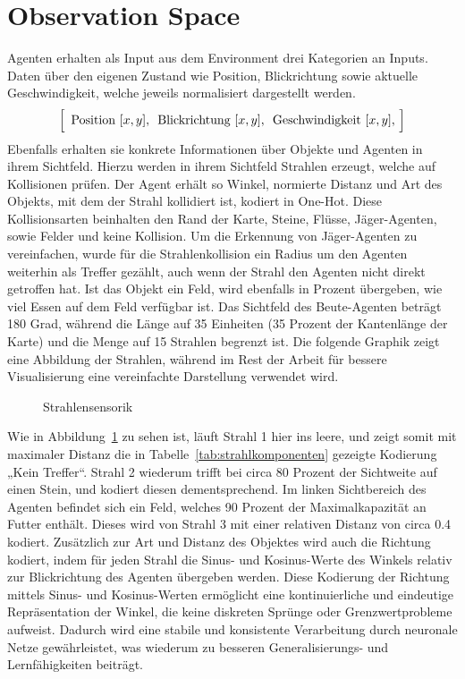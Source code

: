 \section{Observation Space}
Agenten erhalten als Input aus dem Environment drei Kategorien an Inputs. Daten über den eigenen Zustand wie Position, Blickrichtung sowie aktuelle Geschwindigkeit, welche jeweils normalisiert dargestellt werden.
\[
\Bigl[ \,
  \text{ Position }[x,y],\,
  \text{ Blickrichtung }[x,y],\,
  \text{ Geschwindigkeit }[x,y],\,
\Bigr]
\]
Ebenfalls erhalten sie konkrete Informationen über Objekte und Agenten in ihrem Sichtfeld. Hierzu werden in ihrem Sichtfeld Strahlen erzeugt, welche auf Kollisionen prüfen. Der Agent erhält so Winkel, normierte Distanz und Art des Objekts, mit dem der Strahl kollidiert ist, kodiert in One-Hot. Diese Kollisionsarten beinhalten den Rand der Karte, Steine, Flüsse, Jäger-Agenten, sowie Felder und  keine Kollision. Um die Erkennung von Jäger-Agenten zu vereinfachen, wurde für die Strahlenkollision ein Radius um den Agenten weiterhin als Treffer gezählt, auch wenn der Strahl den Agenten nicht direkt getroffen hat. Ist das Objekt ein Feld, wird ebenfalls in Prozent übergeben, wie viel Essen auf dem Feld verfügbar ist. Das Sichtfeld des Beute-Agenten beträgt 180 Grad, während die Länge auf 35 Einheiten (35 Prozent der Kantenlänge der Karte) und die Menge auf 15 Strahlen begrenzt ist. Die folgende Graphik zeigt eine Abbildung der Strahlen, während im Rest der Arbeit für bessere Visualisierung eine vereinfachte Darstellung verwendet wird. 
\begin{figure}[h]
  \centering
  \caption{Strahlensensorik}
  \label{fig:ray-observation}
\end{figure}
\newline
Wie in Abbildung~\ref{fig:ray-observation} zu sehen ist, läuft Strahl 1 hier ins leere, und zeigt somit mit maximaler Distanz die in Tabelle~\ref{tab:strahlkomponenten} gezeigte Kodierung „Kein Treffer“. Strahl 2 wiederum trifft bei circa 80 Prozent der Sichtweite auf einen Stein, und kodiert diesen dementsprechend. Im linken Sichtbereich des Agenten befindet sich ein Feld, welches 90 Prozent der Maximalkapazität an Futter enthält. Dieses wird von Strahl 3 mit einer relativen Distanz von circa 0.4 kodiert. Zusätzlich zur Art und Distanz des Objektes wird auch die Richtung kodiert, indem für jeden Strahl die Sinus- und Kosinus-Werte des Winkels relativ zur Blickrichtung des Agenten übergeben werden. Diese Kodierung der Richtung mittels Sinus- und Kosinus-Werten ermöglicht eine kontinuierliche und eindeutige Repräsentation der Winkel, die keine diskreten Sprünge oder Grenzwertprobleme aufweist. Dadurch wird eine stabile und konsistente Verarbeitung durch neuronale Netze gewährleistet, was wiederum zu besseren Generalisierungs- und Lernfähigkeiten beiträgt.
